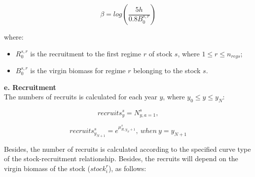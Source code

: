 \documentclass{article}
\begin{document}
\begin{equation}
\beta = log\left(\dfrac{5h}{0.8B^{s,r}_0}\right)
\end{equation}

where:

\begin{itemize}

\item $R^{s,r}_0$ is the recruitment to the first regime $r$ of stock $s$, where $1\leq r \leq n_{regs}$;

\item $B^{s,r}_0$ is the virgin biomass for regime $r$ belonging to the stock $s$.


\end{itemize}

\hfill

\textbf{e. Recruitment}\\


The numbers of recruits is calculated for each year $y$, where $y_0\leq y \leq y_N$:

\begin{equation}
    recruits^s_y =N^s_{y,a = 1},
\end{equation}


\begin{equation}
    recruits^s_{y_{N+1}}=e^{\mu^s_{R,y_N+1}}, \ when \ y = y_{N+1}
\end{equation}

Besides, the number of recruits is calculated according to the specified curve type of the stock-recruitment relationship. Besides, the recruits will depend on the virgin biomass of the stock ($stock_i^r$), as follows:
\end{document}
